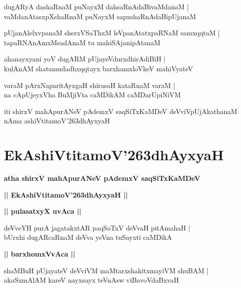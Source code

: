 \documentclass[twoside,12pt,openright]{book}
\def\S{\char'263}
\newcounter{shloka}[chapter]
\def\uvaca#1{\centerline{{\large\textbf{#1}}}}
\begin{document}
\begin{shloka}%
dugARyA dashaRnaM puNayxM dahsaRnAdaBivaMdanaM |\\
vaMdanAtasxpXshaRnaM puNayxM sapxshaRnAdaBipUjanaM 
\end{shloka}

\begin{shloka}%
pUjanAlelxvpanaM sherxVSaThxM leVpanAtatxpaRNaM samxqqtaM |\\
tapaRNAnAmxMsadAnaM tu mahiSAjanipAtanaM 
\end{shloka}

\begin{shloka}%
ahanayxyani yoV dugARM pUjayeVdurxdhirAdiBiH |\\
kulAnAM shatamudadhxqqtayx barxhamxloVkeV mahiVyateV 
\end{shloka}

\begin{shloka}%
varaM pArxNaparitAyxgaH shirasaH kataRnaM varaM |\\
na cApUjeyxVha BuMjiVta caMDikAM caMDarUpiNiVM
\end{shloka}

\begin{center}
iti shirxV mahApurANeV pAdemxV saqSiTxKaMDeV deVviVpUjAkathanaM nAma ashiVtitamoV\S dhAyxyaH 
\end{center}

\chapter{EkAshiVtitamoV\S dhAyxyaH}

\begin{center}
{\LARGE\bfseries atha shirxV mahApurANeV pAdemxV saqSiTxKaMDeV}
\end{center}

\begin{center}
{\LARGE\bfseries || EkAshiVtitamoV\S dhAyxyaH || }
\end{center}

\uvaca{|| pulasatxyX uvAca ||}

\begin{shloka}%
deVveYH purA jagatakxtAR paqSoTxV deVvaH pitAmahaH |\\
bUrxhi dugARcaRnaM deVva yeVna tuSayxti caMDikA 
\end{shloka}

\uvaca{|| barxhomxVvAca ||}

\begin{shloka}%
shaMBuH pUjayateV deVviVM maMtarxshakitxmayiVM shuBAM |\\
akaSxmAlAM kareV nayxsayx teVnAsw viBavoVdaBxvaH 
\end{shloka}
\end{document}
